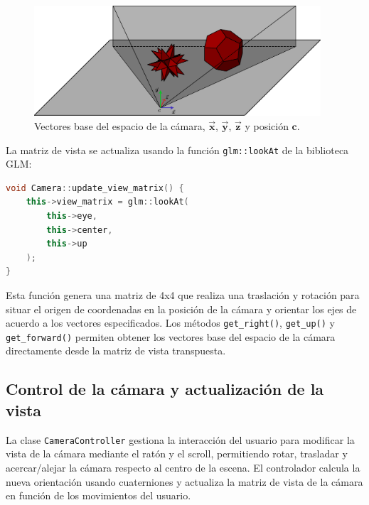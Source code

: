 \begin{figure} [!hbt]
    \begin{center}
        \includegraphics[width=0.95\textwidth]{imagenes/view_matrix_vectors_diagram.pdf}
    \end{center}
    \caption{Vectores base del espacio de la cámara, $\vec{\bm{x}}$, $\vec{\bm{y}}$, $\vec{\bm{z}}$ y posición $\bm{c}$.}\label{fig:camera_view_matrix_vectors_diagram}
\end{figure}

La matriz de vista se actualiza usando la función \texttt{glm::lookAt} de la
biblioteca GLM:

\begin{lstlisting}[language=C++,caption={Actualización de la matriz de vista en Copper}]
void Camera::update_view_matrix() {
    this->view_matrix = glm::lookAt(
        this->eye,
        this->center,
        this->up
    );
}
\end{lstlisting}

Esta función genera una matriz de 4x4 que realiza una traslación y rotación
para situar el origen de coordenadas en la posición de la cámara y orientar los
ejes de acuerdo a los vectores especificados. Los métodos
\texttt{get\_right()}, \texttt{get\_up()} y \texttt{get\_forward()} permiten
obtener los vectores base del espacio de la cámara directamente desde la matriz
de vista transpuesta.

\subsection{Control de la cámara y actualización de la vista}

La clase \texttt{CameraController} gestiona la interacción del usuario para
modificar la vista de la cámara mediante el ratón y el scroll, permitiendo
rotar, trasladar y acercar/alejar la cámara respecto al centro de la escena. El
controlador calcula la nueva orientación usando cuaterniones y actualiza la
matriz de vista de la cámara en función de los movimientos del usuario.

